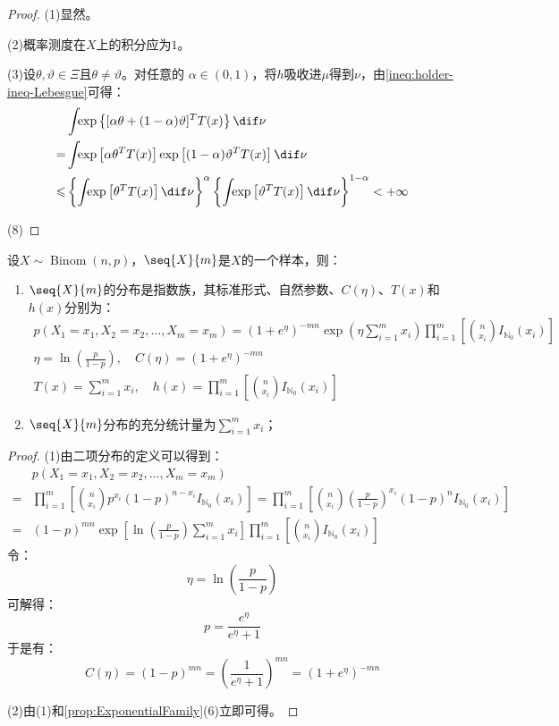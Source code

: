 \begin{proof}
	(1)显然。\par
	(2)概率测度在$X$上的积分应为$1$。\par
	(3)设$\theta,\vartheta\in\Xi$且$\theta\ne\vartheta$。对任意的 $\alpha\in(0,1)$，将$h$吸收进$\mu$得到$\nu$，由\cref{ineq:holder-ineq-Lebesgue}可得：
	\begin{align*}
		&\int_{}\exp\left\{[\alpha\theta+(1-\alpha)\vartheta]^TT(x)\right\}\dif\nu \\
		=&\int_{}\exp\left[\alpha\theta^TT(x)\right]\exp\left[(1-\alpha)\vartheta^TT(x)\right]\dif\nu \\
		\leqslant&\left\{\int_{}\exp\left[\theta^TT(x)\right]\dif\nu\right\}^{\alpha}\left\{\int_{}\exp\left[\vartheta^TT(x)\right]\dif\nu\right\}^{1-\alpha}<+\infty
	\end{align*}\par
	(8)
\end{proof}
\begin{theorem}
	设$X\sim\operatorname{Binom}(n,p)$，$\seq{X}{m}$是$X$的一个样本，则：
	\begin{enumerate}
		\item $\seq{X}{m}$的分布是指数族，其标准形式、自然参数、$C(\eta)$、$T(x)$和$h(x)$分别为：
		\begin{gather*}
			p(X_1=x_1,X_2=x_2,\dots,X_m=x_m)=(1+e^{\eta})^{-mn}\exp\left(\eta\sum_{i=1}^{m}x_i\right)\prod_{i=1}^{m}\left[\binom{n}{x_i}I_{\mathbb{N}_0}(x_i)\right] \\
			\eta=\ln\left(\frac{p}{1-p}\right),\quad C(\eta)=(1+e^{\eta})^{-mn} \\ T(x)=\sum_{i=1}^{m}x_i,\quad h(x)=\prod_{i=1}^{m}\left[\binom{n}{x_i}I_{\mathbb{N}_0}(x_i)\right]
		\end{gather*}
		\item $\seq{X}{m}$分布的充分统计量为$\sum\limits_{i=1}^{m}x_i$；
	\end{enumerate}
\end{theorem}
\begin{proof}
	(1)由二项分布的定义可以得到：
	\begin{align*}
		&p(X_1=x_1,X_2=x_2,\dots,X_m=x_m) \\
		=&\prod_{i=1}^{m}\left[\binom{n}{x_i}p^{x_i}(1-p)^{n-x_i}I_{\mathbb{N}_0}(x_i)\right]=\prod_{i=1}^{m}\left[\binom{n}{x_i}\left(\frac{p}{1-p}\right)^{x_i}(1-p)^nI_{\mathbb{N}_0}(x_i)\right] \\
		=&(1-p)^{mn}\exp\left[\ln\left(\frac{p}{1-p}\right)\sum_{i=1}^{m}x_i\right]\prod_{i=1}^{m}\left[\binom{n}{x_i}I_{\mathbb{N}_0}(x_i)\right]
	\end{align*}
	令：
	\begin{equation*}
		\eta=\ln\left(\frac{p}{1-p}\right)
	\end{equation*}
	可解得：
	\begin{equation*}
		p=\frac{e^{\eta}}{e^{\eta}+1}
	\end{equation*}
	于是有：
	\begin{equation*}
		C(\eta)=(1-p)^{mn}=\left(\frac{1}{e^{\eta}+1}\right)^{mn}=(1+e^{\eta})^{-mn}
	\end{equation*}\par
	(2)由(1)和\cref{prop:ExponentialFamily}(6)立即可得。
\end{proof}

